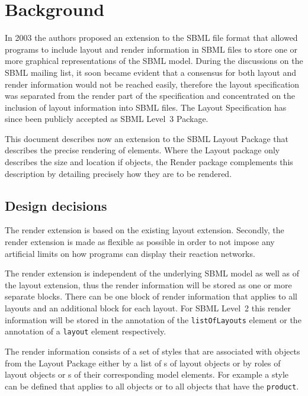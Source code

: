 
\section{Background}
\label{background}

In 2003 the authors proposed an extension to the SBML file format that allowed programs 
to include layout and render information in SBML files to store one or more 
graphical representations of the SBML model. During the discussions on the
SBML mailing list, it soon became evident that a consensus for both layout and render 
information would not be reached easily, therefore the layout specification was 
separated from the render part of the specification and concentrated on the inclusion of 
layout information into SBML files. The Layout Specification has since been publicly 
accepted as SBML Level~3 Package. 

This document describes now an extension to the SBML Layout Package that describes 
the precise rendering of elements. Where the Layout package only describes the size and 
location if objects, the Render package complements this description by detailing 
precisely how they are to be rendered. 

\subsection{Design decisions}

The render extension is based on the existing layout extension. Secondly, the render extension 
is made as flexible as possible in order to not impose any artificial limits on how 
programs can display their reaction networks.

The render extension is independent of the underlying SBML model as well as of the layout extension, 
thus the render information will be stored as one or more separate blocks. There can be one 
block of render information that applies to all layouts and an additional block for each 
layout. For SBML Level~2 this render information will be stored in the annotation of the 
\texttt{listOfLayouts} element or the annotation of a \texttt{layout} element 
respectively.

The render information consists of a set of styles that are associated with 
objects from the Layout Package either by a list of s of layout objects or 
by roles of layout objects or s of their corresponding model elements. For example 
a style can be defined that applies to all \SpeciesReference 
objects or to all objects that have the  \texttt{product}. 


